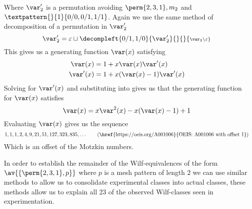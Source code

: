 Where \(\scriptvar^\prime_2\) is a permutation avoiding \(\perm{2,3,1}, m_2\)
and \(\textpattern{}{1}{0/0,0/1,1/1}\). Again we use the same method of
decomposition of a permutation in \(\scriptvar^\prime_2\)
\begin{equation*}
    \scriptvar^\prime_2 = \varepsilon \sqcup
    \decompleft{0/1,1/0}{\scriptvar^\prime_2}{}{}{\scriptstyle \scriptvar_2\setminus\varepsilon}
\end{equation*}
This gives us a generating function \(\var(x)\) satisfying
\begin{align}
    \var(x) &= 1 + x\var(x)\var^\prime(x) \label{eqn:Pgen}\\
    \var^\prime(x) &= 1 + x(\var(x)-1)\var^\prime(x)\label{eqn:PprimeGen}
\end{align}
Solving  for \(\var^\prime(x)\) and substituting into
 gives us that the generating function for
\(\var(x)\) satisfies
\begin{equation}
    \var(x) = x\var^2(x) - x(\var(x) - 1) + 1
\end{equation}
Evaluating \(\var(x)\) gives us the sequence
\begin{equation*}
    1, 1, 1, 2, 4, 9, 21, 51, 127, 323, 835,\dotsc \tag{\href{https://oeis.org/A001006}{OEIS: A001006 with offset 1}}
\end{equation*}
Which is an offset of the Motzkin numbers.

In order to establish the remainder of the Wilf-equivalences of the form
\(\av{\{\perm{2,3,1},p\}}\) where \(p\) is a mesh pattern of length \(2\) we can
use similar methods to allow us to consolidate experimental classes into actual
classes, these methods allow us to explain all 23 of the observed Wilf-classes
seen in experimentation.

